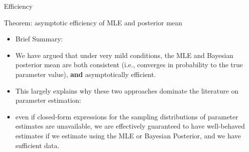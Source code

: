\begin{frame}[allowframebreaks]{Efficiency}
\begin{block}{Theorem: asymptotic efficiency of MLE and posterior mean}

  \end{block}

  \framebreak

  \begin{itemize}
    \item \alert{Brief Summary}:
    \item We have argued that under very mild conditions, the MLE and Bayesian posterior mean are both \alert{consistent} (i.e., converges in probability to the true parameter value), \textbf{and} \alert{asymptotically efficient}.
    \item This largely explains why these two approaches dominate the literature on parameter estimation:
    \item even if closed-form expressions for the sampling distributions of parameter estimates are unavailable, we are effectively guaranteed to have well-behaved estimates if we estimate using the MLE or Bayesian Posterior, and we have sufficient data.
  \end{itemize}

  \framebreak


\end{frame}
